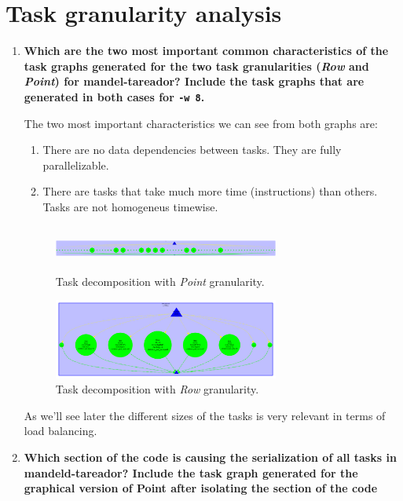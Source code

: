 \documentclass[a4paper,11pt]{article}
\newcommand{\answerspace}{\vspace{0.5cm}}
\begin{document}
\section{Task granularity analysis}
\begin{enumerate}
\setcounter{enumi}{0}
\item
\textbf{Which are the two most important common
    characteristics of the task graphs generated for the two task
    granularities (\emph{Row} and \emph{Point}) for
    \textbf{mandel-tareador}?  Include the task graphs that are
    generated in both cases for \texttt{-w 8}.}

\answerspace
The two most important characteristics we can see from both graphs are:
\begin{enumerate}[(1)]
  \item There are no data dependencies between tasks. They are fully parallelizable.
  \item There are tasks that take much more time (instructions) than
    others. Tasks are not homogeneus timewise.
\end{enumerate}

\begin{figure}[h!]
\includegraphics[width=0.7\textwidth, height=1.5cm]{figures/point_deps_mandel.pdf}
\caption{Task decomposition with \emph{Point} granularity.}
\label{figure:mandel-point}
\end{figure}

\begin{figure}[h!]
\includegraphics[width=0.7\textwidth]{figures/row_deps_mandel.pdf}
\caption{Task decomposition with \emph{Row} granularity.}
\label{figure:mandel-row}
\end{figure}

As we'll see later the different sizes of the tasks is very relevant in terms
of load balancing.

\newpage
\setcounter{enumi}{1}
\item
\textbf{Which section of the code is causing the serialization of
    all tasks in mandeld-tareador? Include the task graph generated for
    the graphical version of Point after isolating the section of the
    code}


\end{enumerate}
\end{document}
